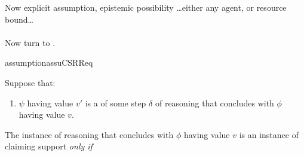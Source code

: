\begin{note}
  Now explicit assumption, epistemic possibility \dots either any agent, or resource bound\dots
\end{note}

\paragraph{\ideaCSB{}}

\begin{note}
  Now turn to \ideaCSB{}.
\end{note}

\begin{note}
  \begin{restatable}{assumption}{assuCSRReq}
    \label{assu:supp:independence}

    Suppose that:
    \begin{enumerate}[label=\Alph*., ref=(\Alph*)]
    \item\label{assu:supp:ind:step} \(\psi\) having value \(v'\) is a \requ{} of some step \(\delta\) of reasoning that concludes with \(\phi\) having value \(v\).
    \end{enumerate}

    The instance of reasoning that concludes with \(\phi\) having value \(v\) is an instance of claiming support \emph{only if}


\end{restatable}
\end{note}
